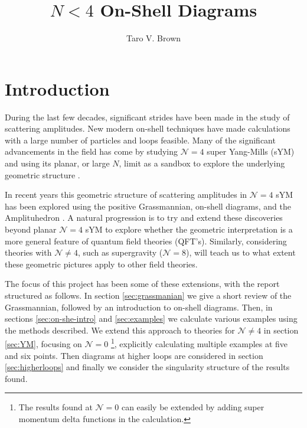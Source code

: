 \documentclass[letter,11pt]{article}
\title{$N<4$ On-Shell Diagrams}
\author[a]{Taro V. Brown}
\affiliation[a]{Department of Physics, UC Davis, One Shields Avenue, Davis, CA 95616, USA }
\begin{document}
 
\maketitle
\flushbottom
\newpage
\section{Introduction}
During the last few decades, significant strides have been made in the study of scattering amplitudes. New modern on-shell techniques have made calculations with a large number of particles and loops feasible. Many of the significant advancements in the field has come by studying $\mathcal N = 4$ super Yang-Mills (sYM)
and using its planar, or large $N$, limit as a sandbox to explore the underlying geometric structure \cite{amp1,amp3,amp4,amp6,Elvang}.

In recent years this geometric structure of scattering amplitudes in $\mathcal N = 4$
sYM has been explored using the positive Grassmannian, on-shell diagrams, and
the Amplituhedron \cite{amp2,on1,on2}. A natural progression is to try and extend these discoveries beyond planar $\mathcal N = 4$ sYM to explore whether the geometric interpretation is a more general feature of quantum field theories (QFT’s). Similarly, considering theories with $\mathcal N\neq 4$, such as supergravity ($\mathcal N = 8$), will teach us to what extent these geometric pictures apply to other field theories. 

The focus of this project has been some of these extensions, with the report structured as follows. In section \ref{sec:grassmanian} we give a short review of the Grassmannian, followed by an introduction to on-shell diagrams. Then, in sections \ref{sec:on-she-intro} and \ref{sec:examples} we calculate various examples using the methods described. We extend this approach to theories for $\mathcal{N}\neq 4$ in section \ref{sec:YM}, focusing on $\mathcal N=0$ \footnote{The results found at $\mathcal{N}=0$ can easily be extended by adding super momentum delta functions in the calculation.}, explicitly calculating multiple examples at five and six points. Then diagrams at higher loops are considered in section \ref{sec:higherloops} and finally we consider the singularity structure of the results found.
\end{document}
